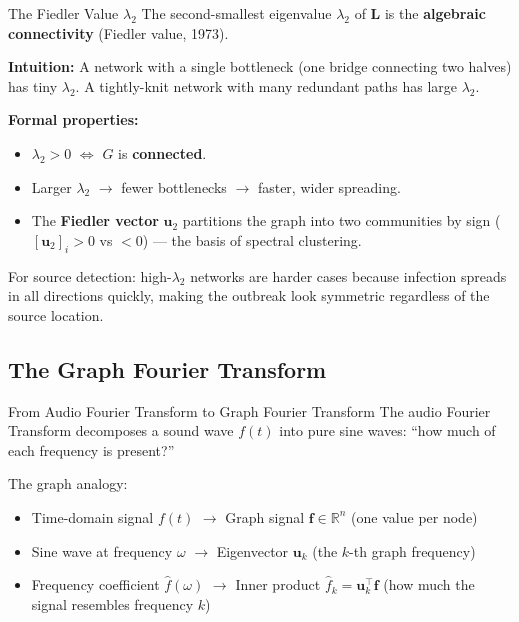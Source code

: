 \begin{keyinsight}{The Fiedler Value $\lambda_2$}
The second-smallest eigenvalue $\lambda_2$ of $\mathbf{L}$ is the \textbf{algebraic connectivity} (Fiedler value, 1973).

\textbf{Intuition:} A network with a single bottleneck (one bridge connecting two halves) has tiny $\lambda_2$. A tightly-knit network with many redundant paths has large $\lambda_2$.

\textbf{Formal properties:}
\begin{itemize}[noitemsep]
    \item $\lambda_2 > 0$ $\iff$ $G$ is \textbf{connected}.
    \item Larger $\lambda_2$ $\to$ fewer bottlenecks $\to$ faster, wider spreading.
    \item The \textbf{Fiedler vector} $\mathbf{u}_2$ partitions the graph into two communities by sign ($[\mathbf{u}_2]_i > 0$ vs $< 0$) --- the basis of spectral clustering.
\end{itemize}

For source detection: high-$\lambda_2$ networks are harder cases because infection spreads in all directions quickly, making the outbreak look symmetric regardless of the source location.
\end{keyinsight}

\subsection{The Graph Fourier Transform}

\begin{analogybox}{From Audio Fourier Transform to Graph Fourier Transform}
The audio Fourier Transform decomposes a sound wave $f(t)$ into pure sine waves: ``how much of each frequency is present?''

The graph analogy:
\begin{itemize}[noitemsep]
    \item Time-domain signal $f(t)$ $\to$ Graph signal $\mathbf{f} \in \mathbb{R}^n$ (one value per node)
    \item Sine wave at frequency $\omega$ $\to$ Eigenvector $\mathbf{u}_k$ (the $k$-th graph frequency)
    \item Frequency coefficient $\hat{f}(\omega)$ $\to$ Inner product $\hat{f}_k = \mathbf{u}_k^\top \mathbf{f}$ (how much the signal resembles frequency $k$)
\end{itemize}
\end{analogybox}

